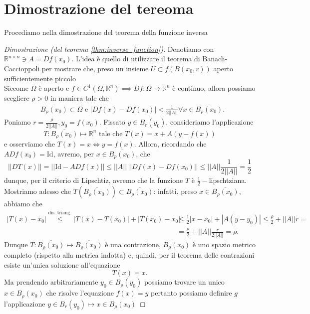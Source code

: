 \section{Dimostrazione del tereoma}
Procediamo nella dimostrazione del teorema della funzione inversa
\begin{proof}[Dimostrazione (del teorema \ref{thm:inverse_function})]
	Denotiamo con $\mathbb{R}^{n \times n} \ni A = Df(x_0)$. L'idea è quello di utilizzare il teorema di Banach-Caccioppoli per mostrare che, preso un insieme $U \subset f(B(x_0, r))$ aperto sufficientemente piccolo\\
	Siccome $\Omega$ è aperto e $f \in C^1(\Omega, \mathbb{R}^n) \implies Df: \Omega \to \mathbb{R}^n$ è continuo, allora possiamo scegliere $\rho > 0$ in maniera tale che
	\begin{align*}
	&\overline{B_{\rho}(x_0)} \subset \Omega \text{    e    } |Df(x) - Df(x_0)| < \frac{1}{2 || A ||} \forall x \in \overline{B_\rho(x_0)}.
	\end{align*}
	Poniamo $r = \frac{\rho}{2 || A ||}, y_0 = f(x_0)$. Fissato $y \in B_r(y_0)$, consideriamo l'applicazione
	$$
	T : \overline{B_{\rho}(x_0)} \mapsto \mathbb{R}^n \text{ tale che } 	T(x) = x + A(y-f(x))
	$$
	e osserviamo che $T(x) = x \iff y=f(x)$. Allora, ricordando che $ADf(x_0) = \text{Id}$, avremo, per $x \in \overline{B_p(x_0)}$, che
	$$
	|| DT(x) || = || \text{Id} - ADf(x) ||  \leq || A || \, || Df(x) - Df(x_0) || \leq || A || \frac{1}{2 || A ||} = \frac{1}{2}
	$$
	dunque, per il criterio di Lipschtiz, avremo che la funzione $T$ è $\frac{1}{2}-$lipschtziana. Mostriamo adesso che $T(\overline{B_\rho(x_0)}) \subset \overline{B_\rho(x_0)}$: infatti, preso $x \in \overline{B_\rho(x_0)}$, abbiamo che
	\begin{align*}
	|T(x) - x_0| \stackrel{\text{dis. triang.}}{\leq} |T(x) - T(x_0)| + |T(x_0) - x_0| &\leq \frac{1}{2} |x-x_0| + |A(y - y_0)| \leq \frac{\rho}{2} + || A || r = \\
	&=\frac{\rho}{2} + || A || \frac{r}{2 || A ||} = \rho.
	\end{align*}
	Dunque $T : \overline{B_\rho(x_0)} \mapsto \overline{B_\rho(x_0)}$ è una contrazione, $B_\rho(x_0)$ è uno spazio metrico completo (rispetto alla metrica indotta) e, quindi, per il teorema delle contrazioni esiste un'unica soluzione all'equazione
	$$
		T(x) = x.
	$$
	Ma prendendo arbitrariamente $y_0 \in B_\rho(y_0)$ possiamo trovare un unico $x \in B_\rho(x_0)$ che risolve l'equazione $f(x) = y$
	pertanto possiamo definire $g$ l'applicazione $y \in B_{r}(y_0) \mapsto x \in B_{\rho}(x_0)$

\end{proof}

